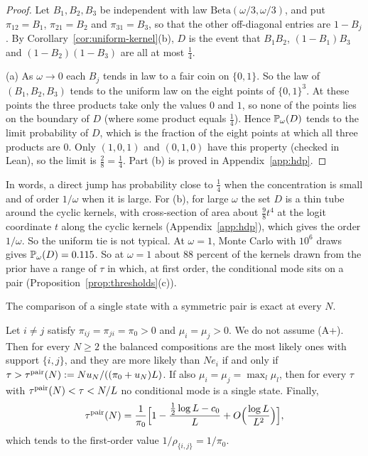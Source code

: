 \begin{proof}
Let $B_1,B_2,B_3$ be independent with law $\mathrm{Beta}(\omega/3,\omega/3)$,
and put $\pi_{12}=B_1$, $\pi_{21}=B_2$ and $\pi_{31}=B_3$, so that the other
off-diagonal entries are $1-B_j$. By Corollary~\ref{cor:uniform-kernel}(b),
$D$ is the event that $B_1B_2$, $(1-B_1)B_3$ and $(1-B_2)(1-B_3)$ are all at
most $\frac14$.

(a) As $\omega\to0$ each $B_j$ tends in law to a fair coin on $\{0,1\}$. So
the law of $(B_1,B_2,B_3)$ tends to the uniform law on the eight points of
$\{0,1\}^3$. At these points the three products take only the values $0$ and
$1$, so none of the points lies on the boundary of $D$ (where some product
equals $\frac14$). Hence $\mathbb P_\omega(D)$ tends to the limit probability of
$D$, which is the fraction of the eight points at which all three products are
$0$. Only $(1,0,1)$ and $(0,1,0)$ have this property (checked in Lean), so the
limit is $\frac28=\frac14$. Part (b) is proved in Appendix~\ref{app:hdp}.
\end{proof}

In words, a direct jump has probability close to $\frac14$ when the
concentration is small and of order $1/\omega$ when it is large. For (b), for
large $\omega$ the set $D$ is a thin tube around the cyclic kernels, with
cross-section of area about $\frac98t^4$ at the logit coordinate $t$ along the
cyclic kernels (Appendix~\ref{app:hdp}), which gives the order $1/\omega$. So
the uniform tie is not typical. At $\omega=1$, Monte Carlo with $10^6$ draws
gives $\mathbb P_\omega(D)=0.115$. So at $\omega=1$ about $88$ percent of the kernels drawn from the
prior have a range of $\tau$ in which, at first order, the conditional mode sits on a pair
(Proposition~\ref{prop:thresholds}(c)).

The comparison of a single state with a symmetric pair is exact at every $N$.

\begin{corollary}\label{cor:sticky-pair}
Let $i\ne j$ satisfy $\pi_{ij}=\pi_{ji}=\pi_0>0$ and $\mu_i=\mu_j>0$. We do not
assume \textup{(A+)}. Then for every $N\ge2$ the balanced compositions are the
most likely ones with support $\{i,j\}$, and they are more likely than $Ne_i$
if and only if $\tau>\tau^{\rm pair}(N):=Nu_N/((\pi_0+u_N)L)$. If also
$\mu_i=\mu_j=\max_l\mu_l$, then for every $\tau$ with
$\tau^{\rm pair}(N)<\tau<N/L$ no conditional mode is a single state. Finally,
\[
 \tau^{\rm pair}(N)=\frac1{\pi_0}\Bigl[1-\frac{\frac12\log L-c_0}{L}
 +O\Bigl(\frac{\log L}{L^2}\Bigr)\Bigr],
\]
which tends to the first-order value $1/\rho_{\{i,j\}}=1/\pi_0$.
\end{corollary}

